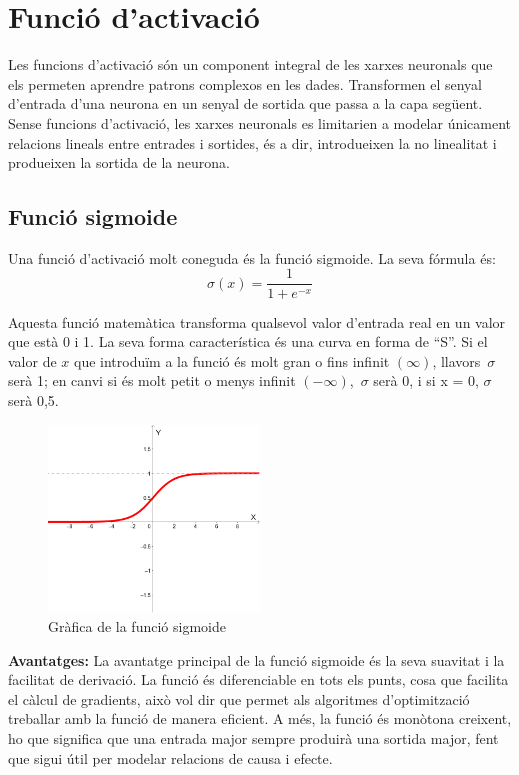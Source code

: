 \section{
Funció d'activació}\label{sec:3.5.3}
Les funcions d'activació són un component integral de les xarxes neuronals que els permeten aprendre patrons complexos en les dades. Transformen el senyal d'entrada d'una neurona en un senyal de sortida que passa a la capa següent. Sense funcions d'activació, les xarxes neuronals es limitarien a modelar únicament relacions lineals entre entrades i sortides, és a dir, introdueixen la no linealitat i produeixen la sortida de la neurona.

\subsection{Funció sigmoide}\label{3.7.1}
Una funció d'activació molt coneguda és la funció sigmoide. La seva fórmula és:
\[ \sigma(x) = \frac{1}{1 + e^{-x}} \]

Aquesta funció matemàtica transforma qualsevol valor d'entrada real en un valor que està 0 i 1. La seva forma característica és una curva en forma de ``S''. Si el valor de $x$ que introduïm a la funció és molt gran o fins infinit $(\infty)$, llavors\ $\sigma$ serà 1; en canvi si és molt petit o menys infinit $(-\infty)$,\ $\sigma$ serà 0, i si x = 0,  $\sigma$  serà 0,5.

\begin{figure}[h!]
    \centering
    \includegraphics[width=0.5\textwidth]{./figures/grafica_sigmoide.png}
    \caption{Gràfica de la funció sigmoide}
\end{figure}

\textbf{Avantatges:}
La avantatge principal de la funció sigmoide és la seva suavitat i la facilitat de derivació. La funció és diferenciable en tots els punts, cosa que facilita el càlcul de gradients, això vol dir que permet als algoritmes d'optimització treballar amb la funció de manera eficient. A més, la funció és monòtona creixent, ho que significa que una entrada major sempre produirà una sortida major, fent que sigui útil per modelar relacions de causa i efecte.


